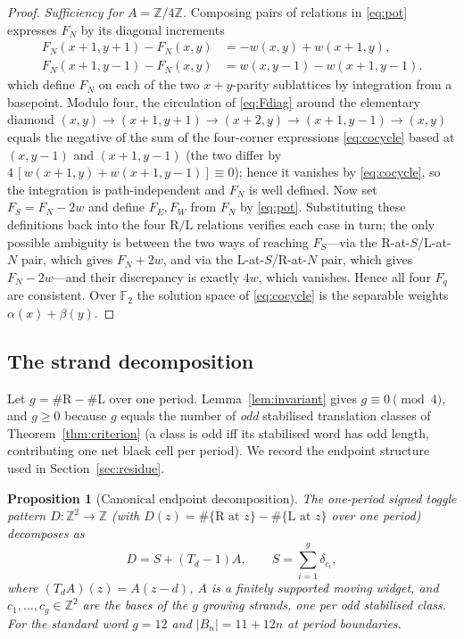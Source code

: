 \documentclass[11pt,letterpaper]{article}
\theoremstyle{plain}
\newtheorem{proposition}[theorem]{Proposition}
\theoremstyle{definition}
\newcommand{\Z}{\mathbb{Z}}
\newcommand{\F}{\mathbb{F}}
\newcommand{\drift}{d}
\newcommand{\growth}{g}
\newcommand{\turnR}{\mathrm{R}}
\newcommand{\turnL}{\mathrm{L}}
\begin{document}
\begin{NoHyper}
\begin{proof}
\emph{Sufficiency for $A=\Z/4\Z$.} Composing pairs of relations in \eqref{eq:pot}
expresses $F_N$ by its diagonal increments
\begin{equation}\label{eq:Fdiag}
\begin{aligned}
F_N(x{+}1,y{+}1)-F_N(x,y)&=-w(x,y)+w(x{+}1,y),\\
F_N(x{+}1,y{-}1)-F_N(x,y)&=w(x,y{-}1)-w(x{+}1,y{-}1).
\end{aligned}
\end{equation}
which define $F_N$ on each of the two $x{+}y$-parity sublattices by integration from a
basepoint. Modulo four, the circulation of \eqref{eq:Fdiag} around the elementary
diamond $(x,y)\to(x{+}1,y{+}1)\to(x{+}2,y)\to(x{+}1,y{-}1)\to(x,y)$ equals the negative
of the sum of the four-corner expressions \eqref{eq:cocycle} based at $(x,y{-}1)$ and
$(x{+}1,y{-}1)$ (the two differ by $4\,[w(x{+}1,y)+w(x{+}1,y{-}1)]\equiv0$); hence it
vanishes by \eqref{eq:cocycle}, so the integration is path-independent and $F_N$ is
well defined. Now set $F_S=F_N-2w$ and define $F_E,F_W$ from $F_N$ by \eqref{eq:pot}.
Substituting these definitions back into the four $\turnR/\turnL$ relations verifies
each case in turn; the only possible ambiguity is between the two ways of reaching
$F_S$---via the $\turnR$-at-$S$/$\turnL$-at-$N$ pair, which gives $F_N+2w$, and via the
$\turnL$-at-$S$/$\turnR$-at-$N$ pair, which gives $F_N-2w$---and their discrepancy is
exactly $4w$, which vanishes. Hence all four $F_q$ are consistent. Over $\F_2$ the
solution space of \eqref{eq:cocycle} is the separable weights $\alpha(x)+\beta(y)$.
\end{proof}

\subsection{The strand decomposition}
Let $\growth=\#\turnR-\#\turnL$ over one period. Lemma~\ref{lem:invariant} gives
$\growth\equiv0\pmod4$, and $\growth\ge0$ because $\growth$ equals the number of
\emph{odd} stabilised translation classes of Theorem~\ref{thm:criterion} (a class is
odd iff its stabilised word has odd length, contributing one net black cell per
period). We record the endpoint structure used in Section~\ref{sec:residue}.

\begin{proposition}[Canonical endpoint decomposition]\label{prop:decomp}
The one-period signed toggle pattern $D:\Z^2\to\Z$ (with $D(z)=\#\{\turnR\text{ at }z\}-\#\{\turnL\text{ at }z\}$ over one period) decomposes as
\begin{equation}\label{eq:decomp}
D=S+(T_\drift-1)A,\qquad S=\sum_{i=1}^{\growth}\delta_{c_i},
\end{equation}
where $(T_\drift A)(z)=A(z-\drift)$, $A$ is a finitely supported \emph{moving widget},
and $c_1,\dots,c_\growth\in\Z^2$ are the bases of the $\growth$ growing strands, one
per odd stabilised class. For the standard word $\growth=12$ and $|B_n|=11+12n$ at
period boundaries.
\end{proposition}


\end{NoHyper}
\end{document}
